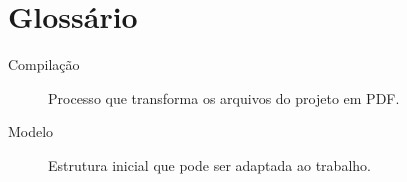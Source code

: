 \clearpage
\chapter*{Glossário}
\begin{description}
  \item[Compilação] Processo que transforma os arquivos do projeto em PDF.
  \item[Modelo] Estrutura inicial que pode ser adaptada ao trabalho.
\end{description}
\clearpage
